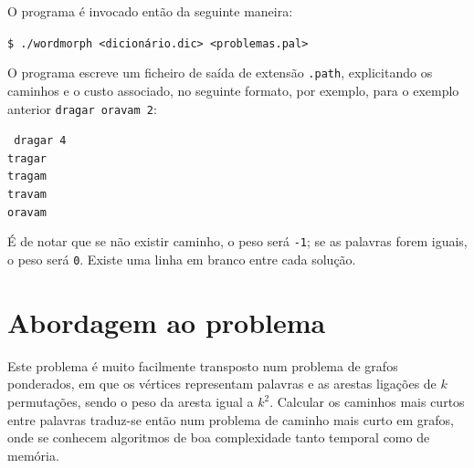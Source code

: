 \documentclass[a4paper, 18pt]{article}
\begin{document}
	\par
	O programa é invocado então da seguinte maneira:
	\begin{center}
		\texttt{\$ ./wordmorph <dicionário.dic> <problemas.pal>}
	\end{center}
	\par
	O programa escreve um ficheiro de saída de extensão \texttt{.path}, explicitando os caminhos e o custo associado, no seguinte formato, por exemplo, para o exemplo anterior \texttt{dragar oravam 2}:
	\begin{center}
		\texttt{
		dragar 4\\
		tragar \\
		tragam \\
		travam \\
		oravam}
	\end{center}
	\par
	É de notar que se não existir caminho, o peso será \texttt{-1}; se as palavras forem iguais, o peso será \texttt{0}. Existe uma linha em branco entre cada solução.


\section{Abordagem ao problema}
	\par
	Este problema é muito facilmente transposto num problema de grafos ponderados, em que os vértices representam palavras e as arestas ligações de $k$ permutações, sendo o peso da aresta igual a $k^2$. Calcular os caminhos mais curtos entre palavras traduz-se então num problema de caminho mais curto em grafos, onde se conhecem algoritmos de boa complexidade tanto temporal como de memória.
\end{document}
